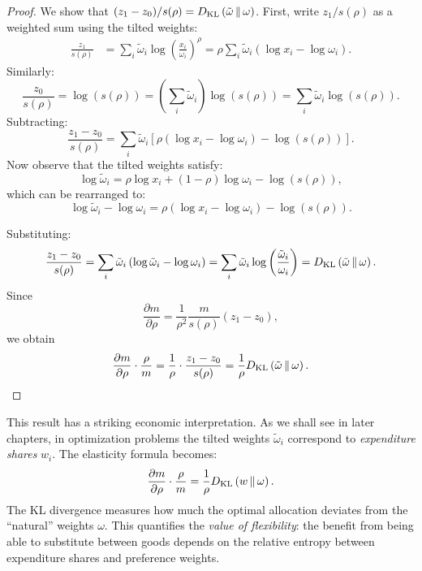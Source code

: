 \begin{proof}
We show that $(z_1 - z_0)/s(\rho) = D_{\mathrm{KL}}\left(\tilde{\omega} \,\|\, \omega\right)$. First, write $z_1/s(\rho)$ as a weighted sum using the tilted weights:
\begin{align}
\frac{z_1}{s(\rho)} &= \sum_i \tilde{\omega}_i \log\left( \frac{x_i}{\omega_i} \right)^\rho = \rho \sum_i \tilde{\omega}_i \left( \log x_i - \log \omega_i \right).
\end{align}
Similarly:
\begin{equation}
\frac{z_0}{s(\rho)} = \log(s(\rho)) = \left( \sum_i \tilde{\omega}_i \right) \log(s(\rho)) = \sum_i \tilde{\omega}_i \log(s(\rho)).
\end{equation}
Subtracting:
\begin{equation}
\frac{z_1 - z_0}{s(\rho)} = \sum_i \tilde{\omega}_i \left[ \rho (\log x_i - \log \omega_i) - \log(s(\rho)) \right].
\end{equation}
Now observe that the tilted weights satisfy:
\begin{equation}
\log \tilde{\omega}_i = \rho \log x_i + (1-\rho) \log \omega_i - \log(s(\rho)),
\end{equation}
which can be rearranged to:
\begin{equation}
\log \tilde{\omega}_i - \log \omega_i = \rho (\log x_i - \log \omega_i) - \log(s(\rho)).
\end{equation}

Substituting:
\begin{equation}
\frac{z_1 - z_0}{s(\rho)} = \sum_i \tilde{\omega}_i \left( \log \tilde{\omega}_i - \log \omega_i \right) = \sum_i \tilde{\omega}_i \log\left( \frac{\tilde{\omega}_i}{\omega_i} \right) = D_{\mathrm{KL}}\left(\tilde{\omega} \,\|\, \omega\right).
\end{equation}
Since
\begin{equation}
\frac{\partial m}{\partial \rho} = \frac{1}{\rho^2} \frac{m}{s(\rho)} (z_1 - z_0),
\end{equation}
we obtain
\begin{equation}
\frac{\partial m}{\partial \rho} \cdot \frac{\rho}{m} = \frac{1}{\rho} \cdot \frac{z_1 - z_0}{s(\rho)} = \frac{1}{\rho} D_{\mathrm{KL}}\left(\tilde{\omega} \,\|\, \omega\right).
\end{equation}
\end{proof}

\begin{calloutimportant}
This result has a striking economic interpretation. As we shall see in later chapters, in optimization problems the tilted weights $\tilde{\omega}_i$ correspond to \emph{expenditure shares} $w_i$. The elasticity formula becomes:
\begin{equation}
\frac{\partial m}{\partial \rho} \cdot \frac{\rho}{m} = \frac{1}{\rho} D_{\mathrm{KL}}\left(w \,\|\, \omega\right).
\end{equation}
The KL divergence measures how much the optimal allocation deviates from the ``natural'' weights $\omega$. This quantifies the \emph{value of flexibility}: the benefit from being able to substitute between goods depends on the relative entropy between expenditure shares and preference weights.
\end{calloutimportant}

